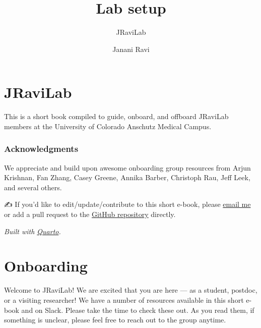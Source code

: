 \documentclass[
  letterpaper,
  DIV=11,
  numbers=noendperiod]{scrreprt}
\title{Lab setup}
\subtitle{JRaviLab}
\author{Janani Ravi}
\date{}
\renewcommand*\contentsname{Table of contents}
\newcommand\contentsname{Table of contents}
\begin{document}
\maketitle
\ifdefined\Shaded\renewenvironment{Shaded}{\begin{tcolorbox}[sharp corners, interior hidden, boxrule=0pt, breakable, borderline west={3pt}{0pt}{shadecolor}, frame hidden, enhanced]}{\end{tcolorbox}}\fi

\renewcommand*\contentsname{Table of contents}
{
\hypersetup{linkcolor=}
\setcounter{tocdepth}{2}
\tableofcontents
}

\hypertarget{jravilab}{%
\chapter*{JRaviLab}\label{jravilab}}

This is a short book compiled to guide, onboard, and offboard JRaviLab
members at the University of Colorado Anschutz Medical Campus.

\hypertarget{acknowledgments}{%
\subsection*{Acknowledgments}\label{acknowledgments}}

We appreciate and build upon awesome onboarding group resources from
Arjun Krishnan, Fan Zhang, Casey Greene, Annika Barber, Christoph Rau,
Jeff Leek, and several others.

✍️ If you'd like to edit/update/contribute to this short e-book, please
\href{mailto:janani.ravi@cuanschutz.edu}{email me} or add a pull request
to the \href{https://github.com/JRaviLab/lab_setup}{GitHub repository}
directly.

\emph{Built with \href{https://quarto.org/docs/books}{Quarto}.}


\hypertarget{onboarding}{%
\chapter{Onboarding}\label{onboarding}}

Welcome to JRaviLab! We are excited that you are here --- as a student,
postdoc, or a visiting researcher! We have a number of resources
available in this short e-book and on Slack. Please take the time to
check these out. As you read them, if something is unclear, please feel
free to reach out to the group anytime.
\end{document}
